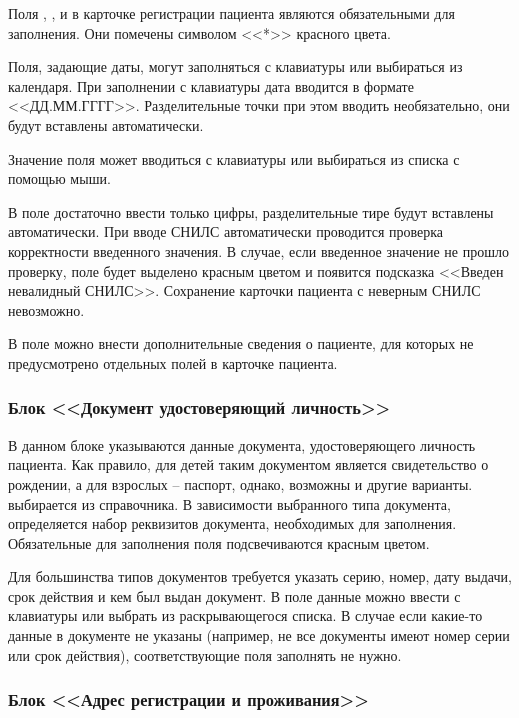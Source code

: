 Поля , ,  и  в карточке регистрации пациента являются обязательными для заполнения. Они помечены символом <<*>> красного цвета.

Поля, задающие даты, могут заполняться с клавиатуры или выбираться из календаря. При заполнении с клавиатуры дата вводится в формате <<ДД.ММ.ГГГГ>>. Разделительные точки при этом вводить необязательно, они будут вставлены автоматически.

Значение поля  может вводиться с клавиатуры или выбираться из списка с помощью мыши. 

В поле  достаточно ввести только цифры, разделительные тире будут вставлены автоматически. При вводе СНИЛС автоматически проводится проверка корректности введенного значения. В случае, если введенное значение не прошло проверку, поле будет выделено красным цветом и появится подсказка <<Введен невалидный СНИЛС>>. Сохранение карточки пациента с неверным СНИЛС невозможно.

В поле  можно внести дополнительные сведения о пациенте, для которых не предусмотрено отдельных полей в карточке пациента. 
 
\subsubsection{Блок <<Документ удостоверяющий личность>>}

В данном блоке указываются данные документа, удостоверяющего личность пациента. Как правило, для детей таким документом является свидетельство о рождении, а для взрослых – паспорт, однако, возможны и другие варианты.  выбирается из справочника. В зависимости выбранного типа документа, определяется набор реквизитов документа, необходимых для заполнения. Обязательные для заполнения поля подсвечиваются красным цветом. 

Для большинства типов документов требуется указать серию, номер, дату выдачи, срок действия и кем был выдан документ. В поле  данные можно ввести с клавиатуры или выбрать из раскрывающегося списка. В случае если какие-то данные в документе не указаны (например, не все документы имеют номер серии или срок действия), соответствующие поля заполнять не нужно.

\subsubsection{Блок <<Адрес регистрации и проживания>>}

